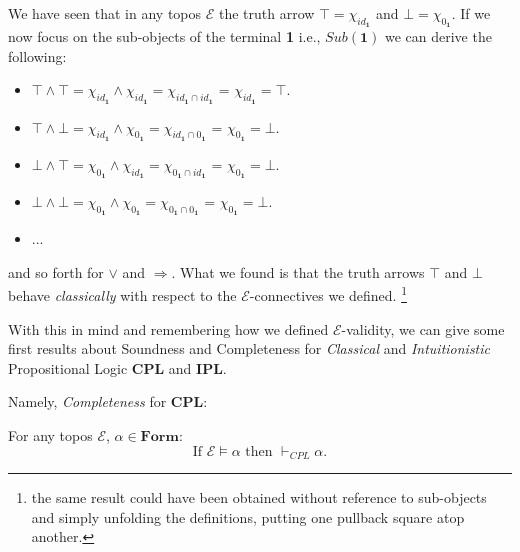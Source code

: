 We have seen that in any topos $\mathcal{E}$ the truth arrow $\top = \chi_{id_\textbf{1}}$ and $\bot = \chi_{0_\textbf{1}}$. \newline
If we now focus on the sub-objects of the terminal \textbf{1} i.e., $Sub(\textbf{1})$  we can derive the following: 
\begin{itemize}
	\item $\top \land \top = \chi_{id_\textbf{1}} \land \chi_{id_\textbf{1}} = \chi_{id_\textbf{1} \cap id_\textbf{1}}$ = $\chi_{id_\textbf{1}} = \top$. 
	\item $\top \land \bot = \chi_{id_\textbf{1}} \land \chi_{0_\textbf{1}} = \chi_{id_\textbf{1} \cap 0_\textbf{1}}$ = $\chi_{0_\textbf{1}} = \bot$.
	\item $\bot \land \top = \chi_{0_\textbf{1}} \land \chi_{id_\textbf{1}} = \chi_{0_\textbf{1} \cap id_\textbf{1}}$ = $\chi_{0_\textbf{1}} = \bot$.
	 \item $\bot \land \bot = \chi_{0_\textbf{1}} \land \chi_{0_\textbf{1}} = \chi_{0_\textbf{1} \cap 0_\textbf{1}}$ = $\chi_{0_\textbf{1}}  = \bot$.
	\item ... 	 
\end{itemize}
and so forth for $\lor$ and $\Rightarrow$.
What we found is that the truth arrows $\top$ and $\bot$ behave \emph{classically} with respect to the $\mathcal{E}$-connectives we defined. \footnote{the same result could have been obtained without reference to sub-objects and simply unfolding the definitions, putting one pullback square atop another.} 

With this in mind and remembering how we defined $\mathcal{E}$-validity, we can give some first results about Soundness and Completeness for \emph{Classical} and \emph{Intuitionistic} Propositional Logic \textbf{CPL} and \textbf{IPL}. \newline

Namely, \emph{Completeness} for \textbf{CPL}: 

\begin{thm}
	For any topos $\mathcal{E}$, $\alpha \in \mathbf{Form}$:
	\begin{equation*}
		\text{If }\mathcal{E} \models \alpha\text{ then }\vdash_{CPL} \alpha.
	\end{equation*} 
\end{thm}

